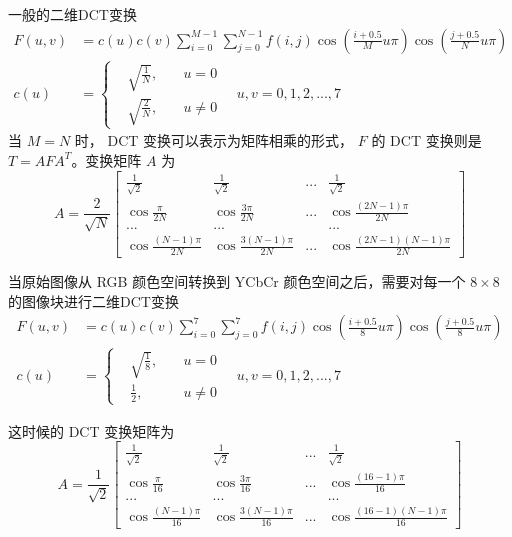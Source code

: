 一般的二维DCT变换
\begin{equation}
    \begin{aligned}
        F(u,v) &=c(u)c(v) \sum_{i=0}^{M-1} \sum_{j=0}^{N-1} f(i,j) \cos(\frac{i+0.5}{M}u\pi) \cos(\frac{j+0.5}{N}u\pi) \\
        c(u) &=\left\{\begin{aligned}
            & \sqrt{\frac{1}{N}}, & \quad u=0 \\
            & \sqrt{\frac{2}{N}}, & \quad u\neq 0
        \end{aligned}\right.
        \quad u,v=0,1,2,...,7
    \end{aligned}
\end{equation}
当 $M=N$ 时， DCT 变换可以表示为矩阵相乘的形式， $F$ 的 DCT 变换则是 $T=AFA^T$。变换矩阵 $A$ 为
\begin{equation}
    A=\frac{2}{\sqrt{N}}
    \begin{bmatrix}
        \frac{1}{\sqrt{2}}      & \frac{1}{\sqrt{2}}        & ...   & \frac{1}{\sqrt{2}} \\
        \cos\frac{\pi}{2N}      & \cos\frac{3\pi}{2N}       & ...   & \cos\frac{(2N-1)\pi}{2N} \\
        ...                     & ...                       &       & ... \\
        \cos\frac{(N-1)\pi}{2N} & \cos\frac{3(N-1)\pi}{2N}  & ...   & \cos\frac{(2N-1)(N-1)\pi}{2N}
    \end{bmatrix}
\end{equation}




当原始图像从 RGB 颜色空间转换到 YCbCr 颜色空间之后，需要对每一个 $8 \times 8$ 的图像块进行二维DCT变换
\begin{equation}
    \begin{aligned}
        F(u,v) &=c(u)c(v) \sum_{i=0}^{7} \sum_{j=0}^{7} f(i,j) \cos(\frac{i+0.5}{8}u\pi) \cos(\frac{j+0.5}{8}u\pi) \\
        c(u) &=\left\{\begin{aligned}
            & \sqrt{\frac{1}{8}},   & \quad u=0 \\
            & \frac{1}{2},          & \quad u\neq 0
        \end{aligned}\right.
        \quad u,v=0,1,2,...,7
    \end{aligned}
\end{equation}

这时候的 DCT 变换矩阵为
\begin{equation}
    A=\frac{1}{\sqrt{2}}
    \begin{bmatrix}
        \frac{1}{\sqrt{2}}      & \frac{1}{\sqrt{2}}        & ...   & \frac{1}{\sqrt{2}} \\
        \cos\frac{\pi}{16}      & \cos\frac{3\pi}{16}       & ...   & \cos\frac{(16-1)\pi}{16} \\
        ...                     & ...                       &       & ... \\
        \cos\frac{(N-1)\pi}{16} & \cos\frac{3(N-1)\pi}{16}  & ...   & \cos\frac{(16-1)(N-1)\pi}{16}
    \end{bmatrix}
\end{equation}

